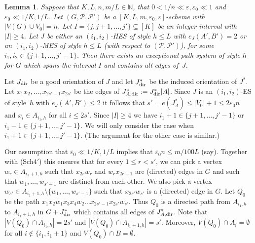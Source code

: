 \documentclass{memo-l}
\newtheorem{lemma}[firstthm]{Lemma}
\def\proof{\removelastskip\penalty55\medskip\noindent{\bf Proof. }}
\def\cP{\mathcal{P}}
\def\eps{\varepsilon}
\def\epszero{\eps_0}
\numberwithin{section}{chapter}
\numberwithin{equation}{section}
\numberwithin{firstthm}{section}
\numberwithin{figure}{section}
\begin{document}
\begin{lemma} \label{lma:EPS}
Suppose that $K, L, n, m/L \in \mathbb{N}$, that $0 <1/n  \ll \eps, \eps_0\ll 1$ and $\eps_0\ll 1/K,1/L$.
Let $(G,\mathcal{P}, \mathcal{P}')$ be a $[K, L, m,\eps_0,\eps]$-scheme with $|V(G)\cup V_0|=n$.
Let $I  = \{j, j+1, \dots, j'\}\subseteq [K]$ be an integer interval with $|I| \ge 4$.
Let $J$ be either an $(i_1, i_2)$-HES of style $h\le L$ with $e_J(A',B')= 2$
or an $(i_1, i_2)$-MES of style $h\le L$ (with respect to $(\cP,\cP')$), for some $i_1, i_2 \in \{j+1, \dots, j'-1\}$.
Then there exists an exceptional path system of style $h$ for $G$
which spans the interval $I$ and contains all edges of~$J$.
\end{lemma}
\proof
Let $J_{\rm dir}$ be a good orientation of $J$ and let $J^*_{\rm dir}$ be the induced orientation of $J^*$.
Let $x_1x_2, \dots, x_{2s'-1} x_{2s'}$ be the edges of $J^*_{A, {\rm dir}}: = J^*_{\rm dir}[A]$.
Since $J$ is an $(i_1,i_2)$-ES of style~$h$ with $e_J(A',B')\le 2$ it follows that
$s' = e(J^*_A) \le |V_0|+1\le 2\epszero n$ and $x_i \in A_{i_1,h}$ for all $i \le 2s'$.
Since $|I| \ge 4$ we have $i_1+1 \in \{j+1, \dots, j'-1\}$ or $i_1-1 \in \{j+1, \dots, j'-1\}$.
We will only consider the case when $i_1+1 \in \{j+1, \dots, j'-1\}$. (The argument for the other case
is similar.) 

Our assumption that $\eps_0\ll 1/K,1/L$ implies that
$\eps_0 n\le m/100L$ (say). 
Together with (Sch$4'$) this ensures that for every $1\le r < s'$, we can pick a vertex $w_r \in A_{i_1+1, h}$
such that $x_{2r}w_r$ and $w_r x_{2r+1}$ are (directed) edges in $G$ and such that $w_1,\dots,w_{s'-1}$ are distinct from each other.
We also pick a vertex $w_{s'} \in A_{i_1+1, h} \setminus \{ w_1, \dots, w_{s'-1}\} $ such that $x_{2s'}w_{s'}$ is a (directed) edge in $G$.
Let $Q_0$ be the path $x_1 x_2 w_1 x_3 x_4 w_2 \dots x_{2s' - 1 } x_{2s'} w_{s'}$.
Thus $Q_0$ is a directed path from $A_{i_1,h}$ to $A_{i_1 +1 ,h}$ in $G + J^*_{\rm dir}$ which contains all edges of $J^*_{A , { \rm dir }} $. 
Note that $|V(Q_0) \cap A_{i_1,h}| = 2s'$ and $|V(Q_0) \cap A_{i_1+1,h}| = s'$.
Moreover, $V(Q_0) \cap A_i = \emptyset$ for all $i \notin \{i_1, i_1+1\}$ and $V(Q_0) \cap B = \emptyset$.
\end{document}
